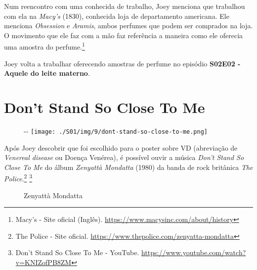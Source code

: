 Num reencontro com uma conhecida de trabalho, Joey menciona que
trabalhou com ela na \emph{Macy's} (1830), conhecida loja de
departamento americana. Ele menciona \emph{Obsession} e \emph{Aramis},
ambos perfumes que podem ser comprados na loja. O movimento que ele faz
com a mão faz referência a maneira como ele oferecia uma amostra do
perfume.\footnote{\sloppy Macy’s - Site oficial (Inglês). \url{https://www.macysinc.com/about/history}}

Joey volta a trabalhar oferecendo amostras de perfume no episódio
\textbf{\textcolor{primarycolor}{S02E02 - Aquele do leite materno}}.

\hypertarget{dont-stand-so-close-to-me}{%
\section{Don't Stand So Close To Me}\label{dont-stand-so-close-to-me}}

\begin{figure}[!ht]
  \begin{adjustwidth}{-\oddsidemargin-1in}{-\rightmargin}
    \centering
    \texttt{[image: ./S01/img/9/dont-stand-so-close-to-me.png]}
  \end{adjustwidth}
\end{figure}

\saveparinfos
\noindent
\begin{minipage}[c]{0.5\textwidth}\useparinfo

Após Joey descobrir que foi escolhido para o poster sobre VD (abreviação
de \emph{Venereal disease} ou Doença Venérea), é possível ouvir a música
\emph{Don't Stand So Close To Me} do álbum \emph{Zenyattà Mondatta}
(1980) da banda de rock britânica \emph{The Police}.\footnote{\sloppy The Police - Site oficial. \url{https://www.thepolice.com/zenyatta-mondatta}}
\footnote{\sloppy Don’t Stand So Close To Me - YouTube. \url{https://www.youtube.com/watch?v=KNIZofPB8ZM}}

\end{minipage}\hfill
\begin{minipage}[c]{0.5\textwidth}

\begin{figure}
  \centering
    \caption{Zenyattà Mondatta\label{fig:zenyatt-mondatta}}
\end{figure}

\end{minipage}

